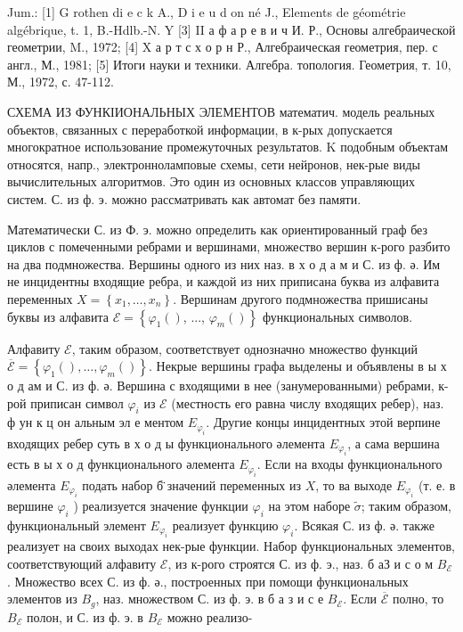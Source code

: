 \documentclass[10pt]{article}
\begin{document}
Jum.: [1] G rothen di e c k A., D i e u d on né J., Elements de géométrie algébrique, t. 1, B.-Hdlb.-N. Y [3] II а ф а р е в и ч И. Р., Основы алгебраической геометрии, M., 1972; [4] X а р т с х о р н Р., Алгебраическая геометрия, пер. с англ., М., 1981; [5] Итоги науки и техники. Алгебра. топология. Геометрия, т. 10, М., 1972, с. 47-112.



СХЕМА ИЗ ФУНКІИОНАЛЬНЫХ ЭЛЕМЕНТОВ математич. модель реальных объектов, связанных с переработкой информации, в к-рых допускается многократное использование промежуточных результатов. K подобным объектам относятся, напр., электронноламповые схемы, сети нейронов, нек-рые виды вычислительных алгоритмов. Это один из основных классов управляющих систем. С. из ф. э. можно рассматривать как автомат без памяти.



Математически С. из Ф. э. можно определить как ориентированный граф без циклов с помеченными ребрами и вершинами, множество вершин к-рого разбито на два подмножества. Вершины одного из них наз. в х о д а м и С. из ф. ә. Им не инцидентны входящие ребра, и каждой из них приписана буква из алфавита переменных $X=\left\{x_{1}, \ldots, x_{n}\right\}$. Вершинам другого подмножества пришисаны буквы из алфавита $\mathscr{E}=\left\{\varphi_{1}()\right.$, ..., $\left.\varphi_{m}()\right\}$ функциональных символов.



Алфавиту $\mathcal{E}$, таким образом, соответствует однозначно множество функций $\overline{\mathscr{E}}=\left\{\varphi_{1}(), \ldots, \varphi_{m}()\right\}$. Некрые вершины графа выделены и объявлены в ы х о д ам и С. из ф. ә. Вершина с входящими в нее (занумерованными) ребрами, к-рой приписан символ $\varphi_{i}$ из $\mathscr{E}$ (местность его равна числу входящих ребер), наз. ф ун к ц он альным эл е ментом $E_{\varphi_{i}}$. Другие концы инцидентных этой верпине входящих ребер суть в х о д ы функционального әлемента $E_{\varphi_{i}}$, а сама вершина есть в ы х о д функционального әлемента $E_{\varphi_{i}}$. Если на входы функционального әлемента $E_{\varphi_{i}}$ подать набор б̈ значений переменных из $X$, то ва выходе $E_{\varphi_{i}}$ (т. е. в вершине $\varphi_{i}$ ) реализуется значение функции $\varphi_{i}$ на этом наборе $\tilde{\sigma}$; таким образом, функциональный элемент $E_{\varphi_{i}}$ реализует функцию $\varphi_{i}$. Всякая С. из ф. ә. также реализует на своих выходах нек-рые функции. Набор функциональных элементов, соответствующий алфавиту $\mathscr{E}$, из к-рого строятся С. из ф. э., наз. б аЗ и с о м $B_{\mathscr{E}}$. Множество всех С. из ф. ә., построенных при помощи функциональных элементов из $B_{g}$, наз. множеством С. из ф. э. в б а з и с е $B_{\mathscr{E}}$. Если $\overline{\mathscr{E}}$ полно, то $B_{\mathscr{E}}$ полон, и С. из ф. э. в $B_{\mathscr{E}}$ можно реализо-
\end{document}
